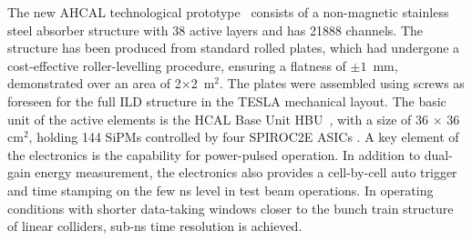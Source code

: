 The new AHCAL technological prototype~\cite{Sefkow:2018rhp} consists of a non-magnetic stainless steel absorber structure with 38 active layers and has 21888 channels. 
The structure has been produced from standard rolled plates, which had undergone a cost-effective roller-levelling procedure, ensuring a flatness of $\pm 1$~mm, demonstrated over an area of 2$\times$2~m$^2$. The plates were assembled using screws as foreseen for the full ILD structure in the TESLA mechanical layout. 
The basic unit of the active elements is the HCAL Base Unit HBU~\cite{Reinecke:2013zua}, with a size of 36 $\times$ 36 cm$^2$, holding 144 SiPMs controlled by four SPIROC2E ASICs \cite{Bouchel:2011zz}.  A key element of the electronics is the capability for power-pulsed operation.
In addition to dual-gain energy measurement, the electronics also provides a cell-by-cell auto trigger and time stamping on the few ns level in test beam operations. In operating conditions with shorter data-taking windows closer to the bunch train structure of linear colliders, sub-ns time resolution is achieved. 

